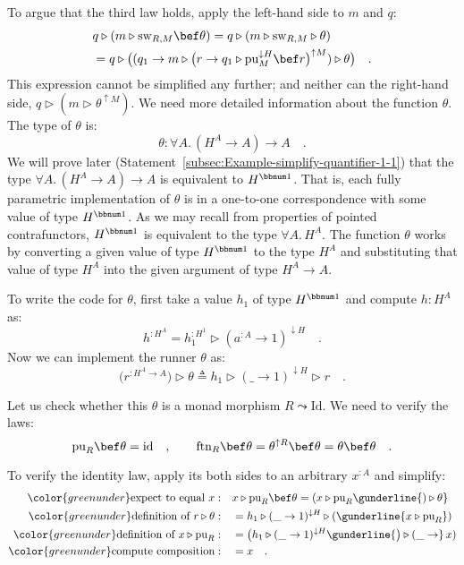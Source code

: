 To argue that the third law holds, apply the left-hand side to $m$
and $q$:
\begin{align}
 & q\triangleright(m\triangleright\text{sw}_{R,M}\bef\theta)=q\triangleright(m\triangleright\text{sw}_{R,M}\triangleright\theta)\nonumber \\
 & =q\triangleright\big((q_{1}\rightarrow m\triangleright\big(r\rightarrow q_{1}\triangleright\text{pu}_{M}^{\downarrow H}\bef r\big)^{\uparrow M})\triangleright\theta\big)\quad.\label{eq:rigid-monad-1-derivation7}
\end{align}
This expression cannot be simplified any further; and neither can
the right-hand side, $q\triangleright(m\triangleright\theta^{\uparrow M})$.
We need more detailed information about the function $\theta$. The
type of $\theta$ is:
\[
\theta:\forall A.\,(H^{A}\rightarrow A)\rightarrow A\quad.
\]
We will prove later (Statement~\ref{subsec:Example-simplify-quantifier-1-1})
that the type $\forall A.\,(H^{A}\rightarrow A)\rightarrow A$ is
equivalent to $H^{\bbnum 1}$. That is, each fully parametric implementation
of $\theta$ is in a one-to-one correspondence with some value of
type $H^{\bbnum 1}$. As we may recall from properties of pointed
contrafunctors, $H^{\bbnum 1}$ is equivalent to the type $\forall A.\,H^{A}$.
The function $\theta$ works by converting a given value of type $H^{\bbnum 1}$
to the type $H^{A}$ and substituting that value of type $H^{A}$
into the given argument of type $H^{A}\rightarrow A$. 

To write the code for $\theta$, first take a value $h_{1}$ of type
$H^{\bbnum 1}$ and compute $h:H^{A}$ as:
\[
h^{:H^{A}}=h_{1}^{:H^{1}}\triangleright(a^{:A}\rightarrow1)^{\downarrow H}\quad.
\]
Now we can implement the runner $\theta$ as:
\begin{equation}
\big(r^{:H^{A}\rightarrow A}\big)\triangleright\theta\triangleq h_{1}\triangleright(\_\rightarrow1)^{\downarrow H}\triangleright r\quad.\label{eq:rigid-monad-base-runner-1}
\end{equation}

Let us check whether this $\theta$ is a monad morphism $R\leadsto\text{Id}$.
We need to verify the laws:
\[
\text{pu}_{R}\bef\theta=\text{id}\quad,\quad\quad\text{ftn}_{R}\bef\theta=\theta^{\uparrow R}\bef\theta=\theta\bef\theta\quad.
\]

To verify the identity law, apply its both sides to an arbitrary $x^{:A}$
and simplify:
\begin{align*}
{\color{greenunder}\text{expect to equal }x:}\quad & x\triangleright\text{pu}_{R}\bef\theta=(x\triangleright\text{pu}_{R}\gunderline{)\triangleright\theta}\\
{\color{greenunder}\text{definition of }r\triangleright\theta:}\quad & =h_{1}\triangleright(\_\rightarrow1)^{\downarrow H}\triangleright(\gunderline{x\triangleright\text{pu}_{R}})\\
{\color{greenunder}\text{definition of }x\triangleright\text{pu}_{R}:}\quad & =\big(h_{1}\triangleright(\_\rightarrow1)^{\downarrow H}\gunderline{\big)\triangleright(\_\rightarrow}\,x)\\
{\color{greenunder}\text{compute composition}:}\quad & =x\quad.
\end{align*}

